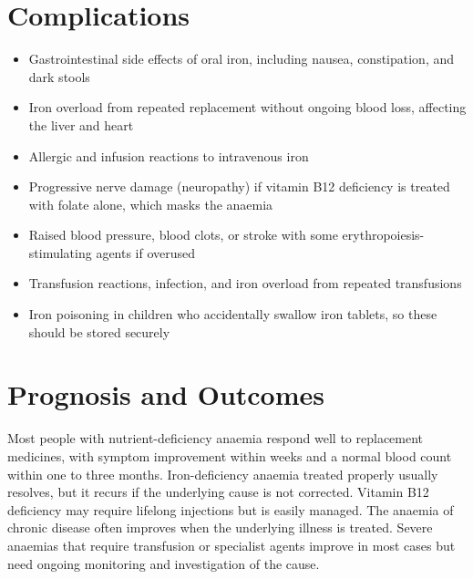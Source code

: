 \section*{Complications}
\begin{itemize}
    \item Gastrointestinal side effects of oral iron, including nausea, constipation, and dark stools
    \item Iron overload from repeated replacement without ongoing blood loss, affecting the liver and heart
    \item Allergic and infusion reactions to intravenous iron
    \item Progressive nerve damage (neuropathy) if vitamin B12 deficiency is treated with folate alone, which masks the anaemia
    \item Raised blood pressure, blood clots, or stroke with some erythropoiesis-stimulating agents if overused
    \item Transfusion reactions, infection, and iron overload from repeated transfusions
    \item Iron poisoning in children who accidentally swallow iron tablets, so these should be stored securely
\end{itemize}

\section*{Prognosis and Outcomes}
Most people with nutrient-deficiency anaemia respond well to replacement medicines, with symptom improvement within weeks and a normal blood count within one to three months. Iron-deficiency anaemia treated properly usually resolves, but it recurs if the underlying cause is not corrected. Vitamin B12 deficiency may require lifelong injections but is easily managed. The anaemia of chronic disease often improves when the underlying illness is treated. Severe anaemias that require transfusion or specialist agents improve in most cases but need ongoing monitoring and investigation of the cause.

